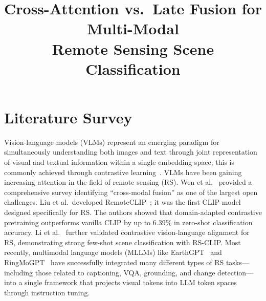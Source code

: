 \documentclass[conference]{IEEEtran}
\begin{document}
\title{Cross-Attention vs.\ Late Fusion for Multi-Modal\\Remote Sensing Scene Classification}

\author{
}

\maketitle

\section{Literature Survey}

Vision-language models (VLMs) represent an emerging paradigm for simultaneously understanding both images and text through joint representation of visual and textual information within a single embedding space; this is commonly achieved through contrastive learning~\cite{radford2021clip}. VLMs have been gaining increasing attention in the field of remote sensing (RS). Wen et al.~\cite{wen2024vlm} provided a comprehensive survey identifying ``cross-modal fusion'' as one of the largest open challenges. Liu et al.\ developed RemoteCLIP~\cite{liu2024remoteclip}; it was the first CLIP model designed specifically for RS. The authors showed that domain-adapted contrastive pretraining outperforms vanilla CLIP by up to 6.39\% in zero-shot classification accuracy. Li et al.~\cite{li2023rsclip} further validated contrastive vision-language alignment for RS, demonstrating strong few-shot scene classification with RS-CLIP. Most recently, multimodal language models (MLLMs) like EarthGPT~\cite{zhang2024earthgpt} and RingMoGPT~\cite{wang2025ringmogpt} have successfully integrated many different types of RS tasks---including those related to captioning, VQA, grounding, and change detection---into a single framework that projects visual tokens into LLM token spaces through instruction tuning.
\end{document}
